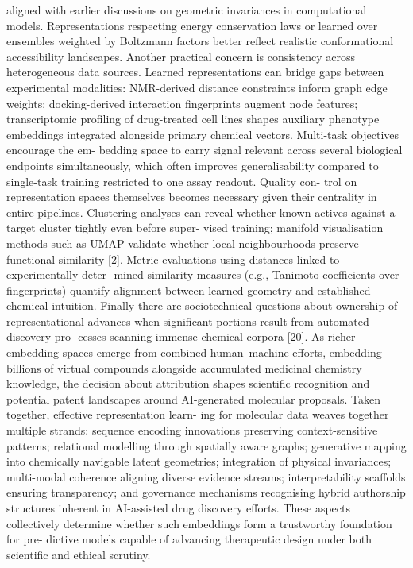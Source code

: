 \documentclass[
]{article}
\begin{document}
aligned with earlier discussions on geometric invariances in
computational models. Representations respecting energy conservation
laws or learned over ensembles weighted by Boltzmann factors better
reflect realistic conformational accessibility landscapes. Another
practical concern is consistency across heterogeneous data sources.
Learned representations can bridge gaps between experimental modalities:
NMR-derived distance constraints inform graph edge weights;
docking-derived interaction fingerprints augment node features;
transcriptomic profiling of drug-treated cell lines shapes auxiliary
phenotype embeddings integrated alongside primary chemical vectors.
Multi-task objectives encourage the em- bedding space to carry signal
relevant across several biological endpoints simultaneously, which often
improves generalisability compared to single-task training restricted to
one assay readout. Quality con- trol on representation spaces themselves
becomes necessary given their centrality in entire pipelines. Clustering
analyses can reveal whether known actives against a target cluster
tightly even before super- vised training; manifold visualisation
methods such as UMAP validate whether local neighbourhoods preserve
functional similarity {[}\protect\hyperlink{_bookmark42}{2}{]}. Metric
evaluations using distances linked to experimentally deter- mined
similarity measures (e.g., Tanimoto coefficients over fingerprints)
quantify alignment between learned geometry and established chemical
intuition. Finally there are sociotechnical questions about ownership of
representational advances when significant portions result from
automated discovery pro- cesses scanning immense chemical corpora
{[}\protect\hyperlink{_bookmark60}{20}{]}. As richer embedding spaces
emerge from combined human--machine efforts, embedding billions of
virtual compounds alongside accumulated medicinal chemistry knowledge,
the decision about attribution shapes scientific recognition and
potential patent landscapes around AI-generated molecular proposals.
Taken together, effective representation learn- ing for molecular data
weaves together multiple strands: sequence encoding innovations
preserving context-sensitive patterns; relational modelling through
spatially aware graphs; generative mapping into chemically navigable
latent geometries; integration of physical invariances; multi-modal
coherence aligning diverse evidence streams; interpretability scaffolds
ensuring transparency; and governance mechanisms recognising hybrid
authorship structures inherent in AI-assisted drug discovery efforts.
These aspects collectively determine whether such embeddings form a
trustworthy foundation for pre- dictive models capable of advancing
therapeutic design under both scientific and ethical scrutiny.
\end{document}
